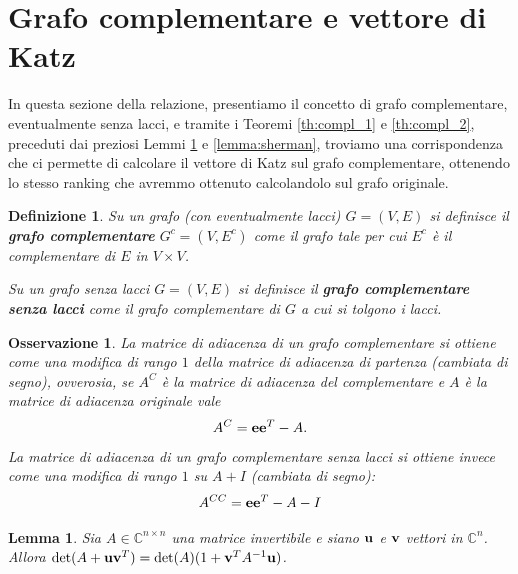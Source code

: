 \documentclass[a4paper]{article}
\newcommand{\CC}{\mathbb{C}}
\newcommand{\evec}{{\bf e}}
\newcommand{\vvec}{{\bf v}}
\newcommand{\uvec}{{\bf u}}
\newtheorem{lemma}{Lemma}
\newtheorem{definition}{Definizione}
\newtheorem{remark}{Osservazione}
\begin{document}
\section{Grafo complementare e vettore di Katz}

In questa sezione della relazione, presentiamo il concetto di grafo
complementare, eventualmente senza lacci, e tramite i Teoremi
\ref{th:compl_1} e \ref{th:compl_2}, preceduti dai preziosi Lemmi
\ref{lemma:matrix_determinant_lemma} e \ref{lemma:sherman},
troviamo una corrispondenza che ci permette di calcolare il vettore di
Katz sul grafo complementare, ottenendo lo stesso ranking che avremmo
ottenuto calcolandolo sul grafo originale.

\begin{definition}
    Su un grafo (con eventualmente lacci) $G = (V, E)$ si definisce il {\rm \textbf{grafo complementare}}
    $G^c = (V, E^c)$ come il grafo tale per cui $E^c$ è il complementare di $E$ in $V \times V$.


    Su un grafo senza lacci $G = (V, E)$ si definisce il {\rm \textbf{grafo complementare senza lacci}} come il grafo complementare di $G$ a cui
    si tolgono i lacci.
\end{definition}

\begin{remark}
    La matrice di adiacenza di un grafo complementare si ottiene come
    una modifica di rango $1$ della matrice di adiacenza di partenza (cambiata di segno), ovverosia, se $A^C$ è la matrice di adiacenza
    del complementare e $A$ è la matrice di adiacenza originale vale
    \[
        A^C = \evec \evec^T - A.
    \]
    La matrice di adiacenza di un grafo complementare senza lacci si
    ottiene invece come una modifica di rango $1$ su $A+I$ (cambiata
    di segno):
    \[
        A^{CC} = \evec \evec^T - A - I
    \]
\end{remark}

\begin{lemma}
    \label{lemma:matrix_determinant_lemma}
    Sia $A \in \CC^{n \times n}$ una matrice invertibile e siano $\uvec$ e $\vvec$ vettori in
    $\CC^n$. Allora $\det(A + \uvec \vvec^T) = \det(A) (1+\vvec^TA^{-1}\uvec)$.
\end{lemma}
\end{document}
